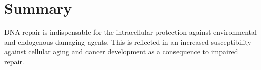 \chapter*{Summary}





DNA repair is indispensable for the intracellular protection against environmental and endogenous damaging agents.
This is reflected in an increased susceptibility against cellular aging and cancer development as a consequence to impaired repair. 




%